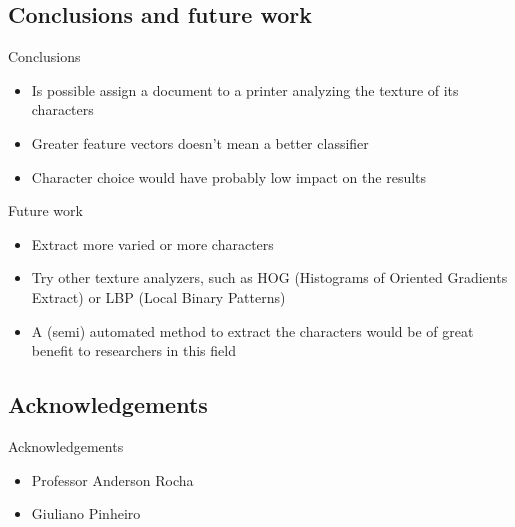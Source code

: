 \documentclass[notes]{beamer}
\begin{document}
\begin{frame}
\section{Conclusions and future work}

\begin{block}{Conclusions}

\begin{itemize}

\item Is possible assign a document to a printer analyzing the texture of its characters

\item Greater feature vectors doesn’t mean a better classifier

\item Character choice would have probably low impact on the results

\end{itemize}

\end{block}

\end{frame}

\begin{frame}

\begin{block}{Future work}

\begin{itemize}

\item Extract more varied or more characters

\item Try other texture analyzers, such as HOG (Histograms of Oriented Gradients Extract) or LBP (Local Binary Patterns)

\item A (semi) automated method to extract the characters would be of great benefit to researchers in this field

\end{itemize}

\end{block}

\end{frame}

\begin{frame}
\section{Acknowledgements}

\begin{block}{Acknowledgements}

\begin{itemize}

\item Professor Anderson Rocha

\item Giuliano Pinheiro

\end{itemize}

\end{block}

\end{frame}
\end{document}
